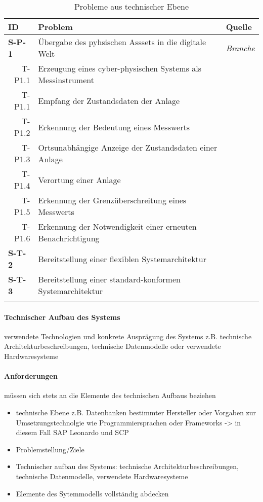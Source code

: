 \begin{table}[ht!]
  \begin{tabularx}{\textwidth}{@{}lXp{2cm}@{}}
      \toprule
      ID                & Problem & Quelle \\
      \midrule
      \textbf{S-P-1}              &       Übergabe des pyhsischen Asssets in die digitale Welt               & \textit{Branche}                \\
      \multicolumn{1}{r}{T-P1.1} &  Erzeugung eines cyber-physischen Systems als Messinstrument \\
      \multicolumn{1}{r}{T-P1.1} &  Empfang der Zustandsdaten der Anlage     \\
      \multicolumn{1}{r}{T-P1.2} &  Erkennung der Bedeutung eines Messwerts \\
      \multicolumn{1}{r}{T-P1.3} &  Ortsunabhängige Anzeige der Zustandsdaten einer Anlage     \\
      \multicolumn{1}{r}{T-P1.4} &  Verortung einer Anlage \\
      \multicolumn{1}{r}{T-P1.5} &  Erkennung der Grenzüberschreitung eines Messwerts \\
      \multicolumn{1}{r}{T-P1.6} &  Erkennung der Notwendigkeit einer erneuten Benachrichtigung\\
      \textbf{S-T-2}              &  Bereitstellung einer flexiblen Systemarchitektur   \\
      \textbf{S-T-3}              &  Bereitstellung einer standard-konformen Systemarchitektur \\
      \addlinespace
      \bottomrule
  \end{tabularx}
  \label{system_probleme}
  \caption{Probleme aus technischer Ebene}
\end{table}
\paragraph{Technischer Aufbau des Systems}
verwendete Technologien und konkrete Ausprägung des Systems
z.B. technische Architekturbeschreibungen, technische Datenmodelle oder verwendete Hardwaresysteme

\paragraph{Anforderungen}
müssen sich stets an die Elemente des technischen Aufbaus beziehen
\begin{itemize}
  \item technische Ebene z.B. Datenbanken bestimmter Hersteller oder Vorgaben zur Umsetzungstechnolgie wie Programmiersprachen oder Frameworks -> in diesem Fall SAP Leonardo und SCP
  \item Problemstellung/Ziele
  \item Technischer aufbau des Systems: technische Architekturbeschreibungen, technische Datenmodelle, verwendete Hardwaresysteme
  \item Elemente des Sytemmodells vollständig abdecken
\end{itemize}



